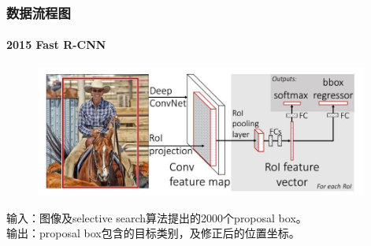 \documentclass{beamer}
\begin{document}
    \begin{frame}
        \frametitle{数据流程图}
        \framesubtitle{2015 Fast R-CNN}
        \begin{figure}
            \centering
            \includegraphics[height=4.3cm]{../graphic/fastrcnnflow.jpg}
        \end{figure}
        输入：图像及selective search算法提出的2000个proposal box。  \\
        输出：proposal box包含的目标类别，及修正后的位置坐标。  \\
    \end{frame}
    
    
\end{document}
